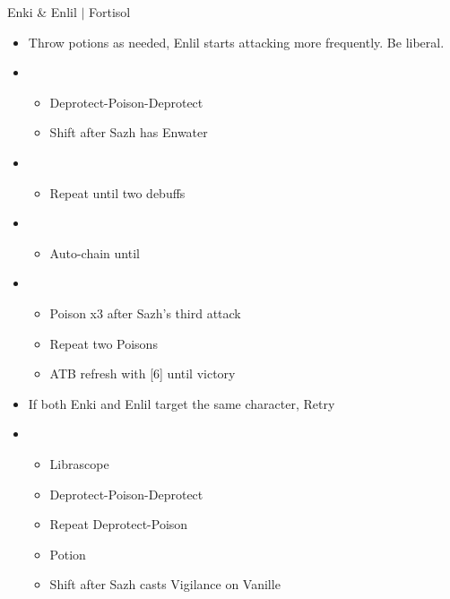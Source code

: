 \documentclass{report}
\begin{document}
\begin{battle}{Enki \& Enlil $|$ Fortisol}
\begin{multicols}{2}
\begin{itemize}
    \begin{itemize}
        \item Poison x3 after Sazh's third attack
        \item If Enki will die to Sazh's next string, ready Deprotect x2 and cast on Enlil after Sazh started attacking
        \item If Enki Bellows, do Poison-Deprotect-Poison until Deprotect hits.
    \end{itemize}
    \item Throw potions as needed, Enlil starts attacking more frequently. Be liberal.
    \item \third
    \begin{itemize}
        \item Deprotect-Poison-Deprotect
        \item Shift after Sazh has Enwater
    \end{itemize}
    \item \fifth
    \begin{itemize}
        \item Repeat until two debuffs
    \end{itemize}
    \item \fourth
    \begin{itemize}
        \item Auto-chain until \stagger
    \end{itemize}
    \item \second
    \begin{itemize}
        \item Poison x3 after Sazh's third attack
        \item Repeat two Poisons
        \item ATB refresh with [6] until victory
    \end{itemize}
\end{itemize}
\columnbreak    
\begin{itemize}
    \item If both Enki and Enlil target the same character, Retry
    \item \third
    \begin{itemize}
        \item Librascope
        \item Deprotect-Poison-Deprotect
        \item Repeat Deprotect-Poison
        \item Potion
        \item Shift after Sazh casts Vigilance on Vanille

\end{itemize}
\end{itemize}
\end{multicols}
\end{battle}
\end{document}
